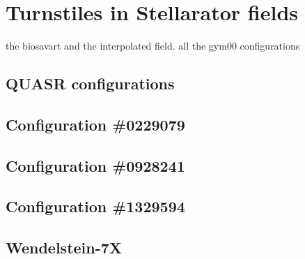 

\chapter{Turnstiles in Stellarator fields}

the biosavart and the interpolated field. all the gym00 configurations

\section{QUASR configurations}

\section{Configuration \#0229079}

\section{Configuration \#0928241}

\section{Configuration \#1329594}

\section{Wendelstein-7X}

